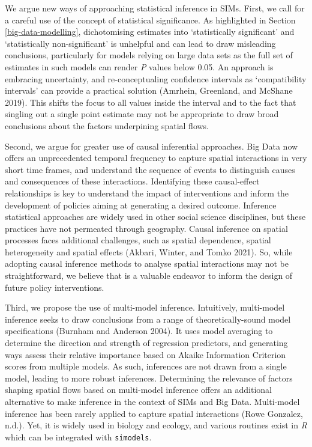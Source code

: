 \documentclass[11pt,letterpaper]{article}
\begin{document}
We argue new ways of approaching statistical inference in SIMs.
First, we call for a careful use of the concept of statistical significance.
As highlighted in Section \ref{big-data-modelling}, dichotomising estimates into `statistically significant' and `statistically non-significant' is unhelpful and can lead to draw misleading conclusions, particularly for models relying on large data sets as the full set of estimates in such models can render \emph{P} values below 0.05.
An approach is embracing uncertainty, and re-conceptualing confidence intervals as `compatibility intervals' can provide a practical solution (Amrhein, Greenland, and McShane 2019).
This shifts the focus to all values inside the interval and to the fact that singling out a single point estimate may not be appropriate to draw broad conclusions about the factors underpining spatial flows.

Second, we argue for greater use of causal inferential approaches.
Big Data now offers an unprecedented temporal frequency to capture spatial interactions in very short time frames, and understand the sequence of events to distinguish causes and consequences of these interactions.
Identifying these causal-effect relationships is key to understand the impact of interventions and inform the development of policies aiming at generating a desired outcome.
Inference statistical approaches are widely used in other social science disciplines, but these practices have not permeated through geography.
Causal inference on spatial processes faces additional challenges, such as spatial dependence, spatial heterogeneity and spatial effects (Akbari, Winter, and Tomko 2021).
So, while adopting causal inference methods to analyse spatial interactions may not be straightforward, we believe that is a valuable endeavor to inform the design of future policy interventions.

Third, we propose the use of multi-model inference.
Intuitively, multi-model inference seeks to draw conclusions from a range of theoretically-sound model specifications (Burnham and Anderson 2004).
It uses model averaging to determine the direction and strength of regression predictors, and generating ways assess their relative importance based on Akaike Information Criterion scores from multiple models.
As such, inferences are not drawn from a single model, leading to more robust inferences.
Determining the relevance of factors shaping spatial flows based on multi-model inference offers an additional alternative to make inference in the context of SIMs and Big Data.
Multi-model inference has been rarely applied to capture spatial interactions (Rowe Gonzalez, n.d.).
Yet, it is widely used in biology and ecology, and various routines exist in \emph{R} which can be integrated with \texttt{simodels}.
\end{document}
